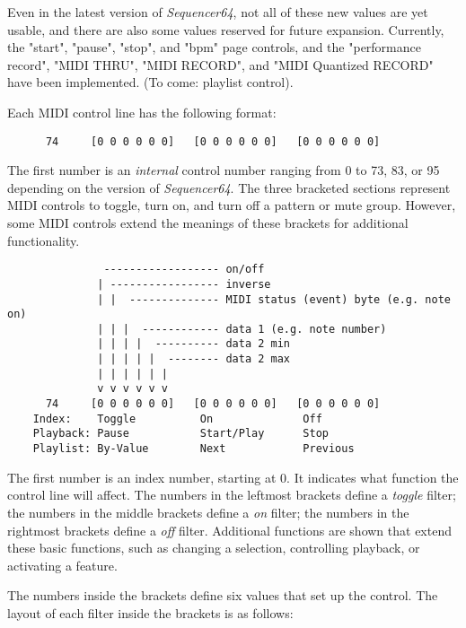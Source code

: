    Even in the latest version of \textsl{Sequencer64}, 
   not all of these new values are yet usable, and there are also some values
   reserved for future expansion.  Currently, the
   "start", "pause", "stop", and "bpm" page controls, and the "performance
   record", "MIDI THRU", "MIDI RECORD", and "MIDI Quantized RECORD"
   have been implemented.
   (To come:  playlist control).

   Each MIDI control line has the following format:

   \begin{verbatim}
      74     [0 0 0 0 0 0]   [0 0 0 0 0 0]   [0 0 0 0 0 0]
   \end{verbatim}

   The first number is an \textsl{internal} control number ranging from
   0 to 73, 83, or 95 depending on the version of \textsl{Sequencer64}.
   The three bracketed sections represent MIDI controls to
   toggle,
   turn on, and
   turn off a pattern or mute group.
   However, some MIDI controls extend the meanings of these brackets
   for additional functionality.

   \begin{verbatim}
               ------------------ on/off
              | ----------------- inverse
              | |  -------------- MIDI status (event) byte (e.g. note on)
              | | |  ------------ data 1 (e.g. note number)
              | | | |  ---------- data 2 min
              | | | | |  -------- data 2 max
              | | | | | |
              v v v v v v
      74     [0 0 0 0 0 0]   [0 0 0 0 0 0]   [0 0 0 0 0 0]
    Index:    Toggle          On              Off
    Playback: Pause           Start/Play      Stop
    Playlist: By-Value        Next            Previous
   \end{verbatim}

   The first number is an index number, starting at 0.  It indicates what
   function the control line will affect.
   The numbers in the leftmost brackets define a \textsl{toggle} filter;
   the numbers in the middle brackets define a \textsl{on} filter;
   the numbers in the rightmost brackets define a \textsl{off} filter.
   Additional functions are shown that extend these basic functions,
   such as changing a selection, controlling playback, or activating a feature.

   The numbers inside the brackets define six values that set up the control.
   The layout of each filter inside the brackets is as follows:


